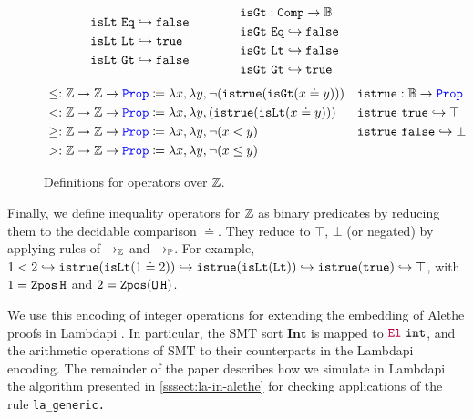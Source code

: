 \begin{figure}
\[\begin{array}{l@{\hspace{4em}}l@{\hspace{4em}}l}
\begin{aligned}
  &\tt{isLt}~\tt{Eq} \re \tt{false} \\
  &\tt{isLt}~\tt{Lt} \re \tt{true} \\
  &\tt{isLt}~\tt{Gt} \re \tt{false} \\
\end{aligned}
&
\begin{aligned}
  &\tt{isGt} : \tt{Comp} \ra \bb{B} \\
  &\tt{isGt}~\tt{Eq} \re \tt{false} \\
  &\tt{isGt}~\tt{Lt} \re \tt{false} \\
  &\tt{isGt}~\tt{Gt} \re \tt{true} 
\end{aligned}
\end{array}
\]
\noindent
\begin{align*}
&\leq: \bb{Z} \ra \bb{Z} \ra \prop  \coloneq \lambda x,\lambda y, \neg (\tt{istrue}(\tt{isGt}(x \doteq y))) & &\tt{istrue} : \bb{B} \ra \prop \\
&<: \bb{Z} \ra \bb{Z} \ra \prop  \coloneq \lambda x,\lambda y, (\tt{istrue}(\tt{isLt}(x \doteq y))) & &\tt{istrue}~\tt{true} \re \top \\
&\geq: \bb{Z} \ra \bb{Z} \ra \prop  \coloneq \lambda x,\lambda y, \neg (x < y) & &\tt{istrue}~\tt{false} \re \bot \\
&>: \bb{Z} \ra \bb{Z} \ra \prop  \coloneq \lambda x,\lambda y, \neg (x \leq y) & &
\end{align*}
\caption{Definitions for operators over $\bb{Z}$.}
\label{fig:arith-ops}
\end{figure}

Finally, we define inequality operators for $\bb{Z}$ as binary predicates by reducing them to the decidable comparison $\doteq$. They reduce to $\top$, $\bot$ (or negated) by applying rules of $\ra_\bb{Z}$ and $\ra_\bb{P}$.
For example, $1 < 2 \hookrightarrow \tt{istrue}(\tt{isLt}(1 \doteq 2)) \hookrightarrow \tt{istrue}(\tt{isLt}(\tt{Lt})) \hookrightarrow \tt{istrue}(\tt{true}) \hookrightarrow \top$, with $1 = \mathop{\tt{Zpos}} \tt{H}$ and $2 = \mathop{\tt{Zpos}} (\mathop{\tt{O}} \tt{H})$.

We use this encoding of integer operations for extending the embedding of Alethe proofs in Lambdapi \cite{ColtellacciMD24}. In particular, the SMT sort $\textbf{Int}$ is mapped to $\el~\texttt{int}$, and the arithmetic operations of SMT to their counterparts in the Lambdapi encoding. The remainder of the paper describes how we simulate in Lambdapi the algorithm presented in \cref{sssect:la-in-alethe} for checking applications of the rule \tt{la\_generic}.

